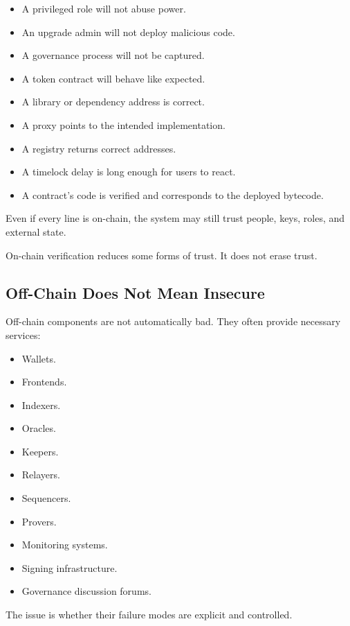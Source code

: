\begin{itemize}
\tightlist
\item
  A privileged role will not abuse power.
\item
  An upgrade admin will not deploy malicious code.
\item
  A governance process will not be captured.
\item
  A token contract will behave like expected.
\item
  A library or dependency address is correct.
\item
  A proxy points to the intended implementation.
\item
  A registry returns correct addresses.
\item
  A timelock delay is long enough for users to react.
\item
  A contract's code is verified and corresponds to the deployed
  bytecode.
\end{itemize}

Even if every line is on-chain, the system may still trust people, keys,
roles, and external state.

On-chain verification reduces some forms of trust. It does not erase
trust.

\subsection{Off-Chain Does Not Mean Insecure}

Off-chain components are not automatically bad. They often provide
necessary services:

\begin{itemize}
\tightlist
\item
  Wallets.
\item
  Frontends.
\item
  Indexers.
\item
  Oracles.
\item
  Keepers.
\item
  Relayers.
\item
  Sequencers.
\item
  Provers.
\item
  Monitoring systems.
\item
  Signing infrastructure.
\item
  Governance discussion forums.
\end{itemize}

The issue is whether their failure modes are explicit and controlled.

